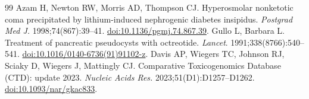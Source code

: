 \begin{thebibliography}{99}
 Azam H, Newton RW, Morris AD, Thompson CJ. Hyperosmolar nonketotic coma precipitated by lithium-induced nephrogenic diabetes insipidus. \textit{Postgrad Med J.} 1998;74(867):39--41. \href{https://doi.org/10.1136/pgmj.74.867.39}{doi:10.1136/pgmj.74.867.39}.
 Gullo L, Barbara L. Treatment of pancreatic pseudocysts with octreotide. \textit{Lancet}. 1991;338(8766):540--541. \href{https://doi.org/10.1016/0140-6736(91)91102-z}{doi:10.1016/0140-6736(91)91102-z}.
 Davis AP, Wiegers TC, Johnson RJ, Sciaky D, Wiegers J, Mattingly CJ. Comparative Toxicogenomics Database (CTD): update 2023. \textit{Nucleic Acids Res.} 2023;51(D1):D1257--D1262. \href{https://doi.org/10.1093/nar/gkac833}{doi:10.1093/nar/gkac833}.
\end{thebibliography}

\endgroup
